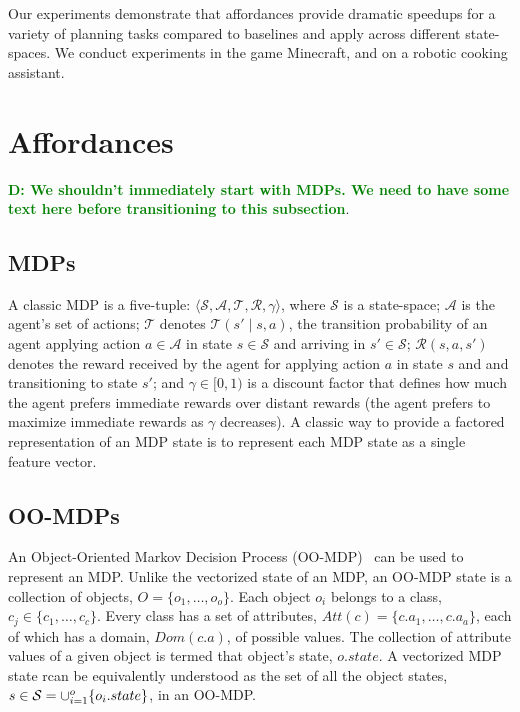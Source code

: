 \documentclass[conference]{IEEEtran}
\newcommand{\dnote}[1]{\textcolor{Green}{\textbf{D: #1}}}
\begin{document}
Our experiments demonstrate that affordances provide dramatic speedups for a variety
of planning tasks compared to baselines and apply across different state-spaces.  We conduct experiments
in the game Minecraft, and on a robotic cooking assistant. 

\section{Affordances}
\label{sec:affordances}

\dnote{We shouldn't immediately start with MDPs. We need to have some text here before transitioning to this subsection}.
\subsection{MDPs}
A classic MDP is a five-tuple: $\langle \mathcal{S}, \mathcal{A}, \mathcal{T},
\mathcal{R}, \gamma \rangle$, where $\mathcal{S}$ is a state-space;
$\mathcal{A}$ is the agent's set of actions; $\mathcal{T}$ denotes
$\mathcal{T}(s' \mid s,a)$, the transition probability of an agent
applying action $a \in \mathcal{A}$ in state $s \in \mathcal{S}$ and
arriving in $s' \in \mathcal{S}$; $\mathcal{R}(s,a,s')$ denotes the
reward received by the agent for applying action $a$ in state $s$ and
and transitioning to state $s'$; and $\gamma \in [0, 1)$ is a discount
  factor that defines how much the agent prefers immediate rewards
  over distant rewards (the agent prefers to maximize
  immediate rewards as $\gamma$ decreases). A classic way to 
  provide a factored representation of an MDP state is to represent
each MDP state as a single feature vector. 

\subsection{OO-MDPs}
An Object-Oriented Markov
Decision Process (OO-MDP)~\citep{diuk08} can be used to represent an MDP.
Unlike the vectorized state of an MDP, an OO-MDP state is a collection of objects,
$O = \{o_1, \ldots, o_o \}$.  Each object $o_i$ belongs to a
class, $c_j \in  \{c_1, \ldots, c_c\}$. Every class has a set of attributes,
$Att(c) = \{c.a_1, \ldots, c.a_a \}$, each of which has a domain, $Dom(c.a)$, of 
possible values. The collection of attribute values of a given object is termed 
that object's state, $o.state$. A vectorized MDP state rcan be equivalently understood as the set
of all the object states, $s \in {\cal S} = \cup_{i = 1}^o \{o_i.state\}$, in an OO-MDP. 
\end{document}

